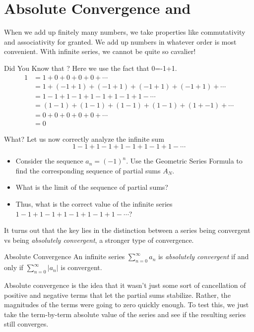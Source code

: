 \section{Absolute Convergence and }
When we add up finitely many numbers, we take properties like commutativity and associativity for granted.  We add up numbers in whatever order is most convenient.  With infinite series, we cannot be quite so cavalier!

\begin{example}{Did You Know that ?}
Here we use the fact that 0=-1+1.
\begin{align*}
1&=1+0+0+0+0+\cdots \\
 &=1+(-1+1)+(-1+1)+(-1+1)+(-1+1)+\cdots \\
 &=1-1+1-1+1-1+1-1+1-\cdots \\
 &=(1-1)+(1-1)+(1-1)+(1-1)+(1+-1)+\cdots \\
&=0+0+0+0+0+\cdots\\
&=0
\end{align*}
\end{example}

\begin{exercise}{What? \Coffeecup \Coffeecup \Coffeecup}
Let us now correctly analyze the infinite sum $$1-1+1-1+1-1+1-1+1-\cdots $$ 

\begin{itemize}
\item Consider the sequence $a_n=(-1)^n$.  Use the Geometric Series Formula to find the corresponding sequence of partial sums $A_N$.
\vspace*{1in}
\item What is the limit of the sequence of partial sums?
\vspace*{.5in}
\item Thus, what is the correct value of the infinite series $1-1+1-1+1-1+1-1+1-\cdots$? \vspace*{.5in}
\end{itemize}
\end{exercise}

It turns out that the key lies in the distinction between a series being convergent vs being \emph{absolutely convergent}, a stronger type of convergence.

\begin{definition}{Absolute Convergence }
An infinite series $\sum_{n=0}^\infty a_n$ is \emph{absolutely convergent} if and only if $\sum_{n=0}^\infty \left| a_n \right|$ is convergent.
\end{definition}
Absolute convergence is the idea that it wasn't just some sort of cancellation of positive and negative terms that let the partial sums stabilize.  Rather, the magnitudes of the terms were going to zero quickly enough.  To test this, we just take the term-by-term absolute value of the series and see if the resulting series still converges. 

